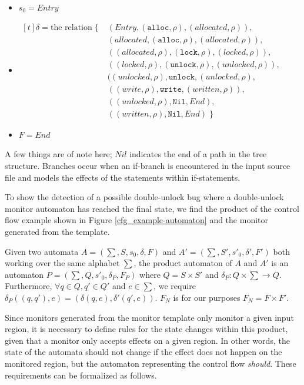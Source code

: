 \begin{itemize}
    \item $s_0 = Entry$ 
    \item {
        $
            \begin{aligned}[t]
            \delta = \text{the relation} \; \{ \; & (Entry, (\texttt{alloc},\rho), (allocated, \rho)), \\ 
            & (allocated, (\texttt{alloc},\rho), (allocated, \rho)), \\ 
            & ((allocated, \rho), (\texttt{lock}, \rho), (locked, \rho)), \\
            & ((locked, \rho), (\texttt{unlock}, \rho), (unlocked, \rho)), \\
            & ((unlocked, \rho), \texttt{unlock}, (unlocked, \rho), \\ 
            & ((write, \rho), \texttt{write}, (written, \rho)), \\ 
            & ((unlocked, \rho), \texttt{Nil}, End), \\ 
            & ((written, \rho), \texttt{Nil}, End) \; \}
            \end{aligned}
        $ 
    }
    \item $F = End$  
\end{itemize}

\noindent A few things are of note here; $Nil$ indicates the end of a path in the tree structure. Branches occur when an if-branch is encountered in the input source file and models the effects of the statements within if-statements.

\newpar To show the detection of a possible double-unlock bug where a double-unlock monitor automaton has reached the final state, we find the product of the control flow example shown in Figure \ref{cfg_example-automaton} and the monitor generated from the template. 

\newpar Given two automata $A = (\sum, S, s_0, \delta, F)$ and $A' = (\sum, S', s'_0, \delta', F')$ both working over the same alphabet $\sum$, the product automaton of $A$ and $A'$ is an automaton $P = (\sum, Q, s'_0, \delta_P, F_P)$ where $Q = S \times S'$ and $\delta_P : Q \times \sum \rightarrow Q$. Furthermore, $\forall q \in Q , q' \in Q'$ and $e \in \sum$, we require $\delta_P((q, q'), e) = (\delta(q, e), \delta'(q', e))$. $F_N$ is for our purposes $F_N = F \times F'$. 

\newpar {}

\newpar Since monitors generated from the monitor template only monitor a given input region, it is necessary to define rules for the state changes within this product, given that a monitor only accepts effects on a given region. In other words, the state of the automata should not change if the effect does not happen on the monitored region, but the automaton representing the control flow \textit{should}. These requirements can be formalized as follows.

